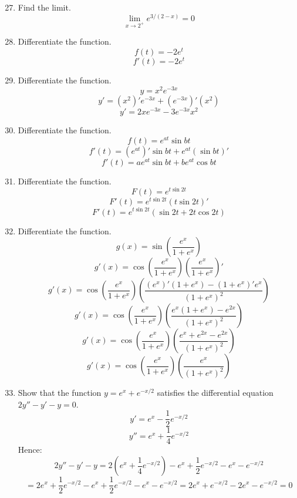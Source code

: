 \documentclass[12pt]{article}
\begin{document}
\begin{enumerate}
\setcounter{enumi}{26}
    \item Find the limit.
    \[\lim_{x \to 2^+} e^{3/(2-x)} = 0\]

\setcounter{enumi}{30}  
    \item Differentiate the function.
    \[f(t) = -2e^t\]
    \[f'(t) = -2e^t\]

\setcounter{enumi}{40}
    \item Differentiate the function.
    \[y = x^2e^{-3x}\]
    \[y' = (x^2)'e^{-3x} + (e^{-3x})'(x^2)\]
    \[y' = 2xe^{-3x} - 3e^{-3x}x^2\]

\setcounter{enumi}{42}  
    \item Differentiate the function.
    \[f(t) = e^{at} \sin bt\]
    \[f'(t) = (e^{at})' \sin bt + e^{at} (\sin bt)'\]
    \[f'(t) = ae^{at} \sin bt + be^{at}\cos bt\]

\setcounter{enumi}{44}  
    \item Differentiate the function.
    \[F(t) = e^{t\sin 2t}\]
    \[F'(t) = e^{t\sin 2t}(t\sin 2t)'\]
    \[F'(t) = e^{t\sin 2t}(\sin 2t + 2t \cos 2t)\]

\setcounter{enumi}{48}  
    \item Differentiate the function.
    \[g(x) = \sin (\frac{e^x}{1+e^x})\]
    \[g'(x) = \cos (\frac{e^x}{1+e^x}) (\frac{e^x}{1+e^x})'\]
    \[g'(x) = \cos (\frac{e^x}{1+e^x})(\frac{(e^x)'(1+e^x) - (1+e^x)'e^x}{(1+e^x)^2})\]
    \[g'(x) = \cos (\frac{e^x}{1+e^x})(\frac{e^x(1+e^x) - e^{2x}}{(1+e^x)^2})\]
    \[g'(x) = \cos (\frac{e^x}{1+e^x})(\frac{e^x+e^{2x} - e^{2x}}{(1+e^x)^2})\]
    \[g'(x) = \cos (\frac{e^x}{1+e^x})(\frac{e^x}{(1+e^x)^2})\]

\setcounter{enumi}{54}
    \item Show that the function \(y = e^x + e^{-x/2}\) satisfies the differential equation \(2y'' - y' - y = 0\).
    \[y' = e^x - \frac{1}{2}e^{-x/2}\]
    \[y'' = e^x + \frac{1}{4}e^{-x/2}\]
    Hence:
    \[2y'' - y' - y = 2(e^x + \frac{1}{4}e^{-x/2}) - e^x + \frac{1}{2}e^{-x/2} - e^x - e^{-x/2}\]
    \[ = 2e^x + \frac{1}{2}e^{-x/2} - e^x + \frac{1}{2}e^{-x/2} - e^x - e^{-x/2} = 2e^x + e^{-x/2} - 2e^x - e^{-x/2} = 0\]


\end{enumerate}
\end{document}
